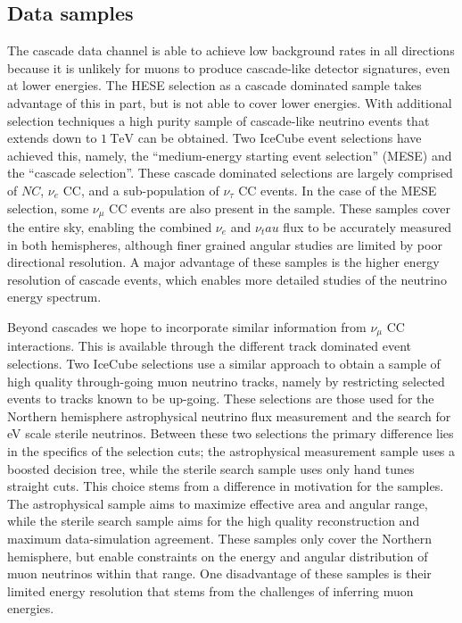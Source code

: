 \subsection{Data samples}
The cascade data channel is able to achieve low background rates in all directions because it is unlikely for muons to produce cascade-like detector signatures, even at lower energies.
The HESE selection as a cascade dominated sample takes advantage of this in part, but is not able to cover lower energies.
With additional selection techniques a high purity sample of cascade-like neutrino events that extends down to $\SI{1}\TeV$ can be obtained.
Two IceCube event selections have achieved this, namely, the ``medium-energy starting event selection'' (MESE) and the ``cascade selection''.
These cascade dominated selections are largely comprised of $NC$, $\nu_e$ CC, and a sub-population of $\nu_\tau$ CC events.
In the case of the MESE selection, some $\nu_\mu$ CC events are also present in the sample.
These samples cover the entire sky, enabling the combined $\nu_e$ and $\nu_tau$ flux to be accurately measured in both hemispheres, although finer grained angular studies are limited by poor directional resolution.
A major advantage of these samples is the higher energy resolution of cascade events, which enables more detailed studies of the neutrino energy spectrum.

Beyond cascades we hope to incorporate similar information from $\nu_\mu$ CC interactions.
This is available through the different track dominated event selections.
Two IceCube selections use a similar approach to obtain a sample of high quality through-going muon neutrino tracks, namely by restricting selected events to tracks known to be up-going.
These selections are those used for the Northern hemisphere astrophysical neutrino flux measurement and the search for eV scale sterile neutrinos.
Between these two selections the primary difference lies in the specifics of the selection cuts; the astrophysical measurement sample uses a boosted decision tree, while the sterile search sample uses only hand tunes straight cuts.
This choice stems from a difference in motivation for the samples.
The astrophysical sample aims to maximize effective area and angular range, while the sterile search sample aims for the high quality reconstruction and maximum data-simulation agreement.
These samples only cover the Northern hemisphere, but enable constraints on the energy and angular distribution of muon neutrinos within that range.
One disadvantage of these samples is their limited energy resolution that stems from the challenges of inferring muon energies.

